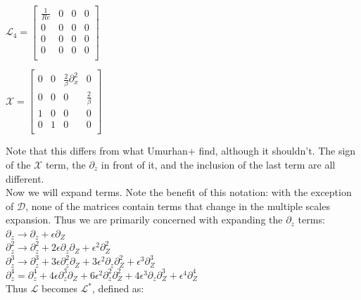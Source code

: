 \documentclass[letterpaper,12pt]{article}
\newcommand\reye{\mathrel{Re}}
\begin{document}
$\mathcal{L}_4 = \left[\begin{matrix}
\frac{1}{\reye} & 0 & 0 & 0 \\
0 & 0 & 0 & 0 \\
0 & 0 & 0 & 0 \\
0 & 0 & 0 & 0 \\ \end{matrix}\right] $ \\

\vspace{2mm}

$\mathcal{X} = \left[\begin{matrix}
0 & 0 & \frac{2}{\beta}\partial_x^2 & 0 \\
0 & 0 & 0 & \frac{2}{\beta} \\
1 & 0 & 0 & 0 \\
0 & 1 & 0 & 0 \\ \end{matrix} \right]$ \\

\vspace{2mm}

Note that this differs from what Umurhan+ find, although it shouldn't. The sign of the $\mathcal{X}$ term, the $\partial_z$ in front of it, and the inclusion of the last term are all different. \\

Now we will expand terms. Note the benefit of this notation: with the exception of $\mathcal{D}$, none of the matrices contain terms that change in the multiple scales expansion. Thus we are primarily concerned with expanding the $\partial_z$ terms: \\

$\partial_z \to \partial_z + \epsilon \partial_Z$ \\

$\partial_z^2 \to \partial_z^2 + 2\epsilon \partial_z \partial_Z + \epsilon^2 \partial_Z^2$ \\

$\partial_z^3 \to \partial_z^3 + 3 \epsilon \partial_z^2 \partial_Z + 3 \epsilon^2 \partial_z \partial_Z^2 + \epsilon^3 \partial_Z^3$ \\

$\partial_z^4 = \partial_z^4 + 4\epsilon \partial_z^3 \partial_Z + 6 \epsilon^2 \partial_z^2 \partial_Z^2 + 4 \epsilon^3 \partial_z \partial_Z^3 + \epsilon^4\partial_Z^4$ \\

Thus $\mathcal{L}$ becomes $\mathcal{L^*}$, defined as: \\
\end{document}
